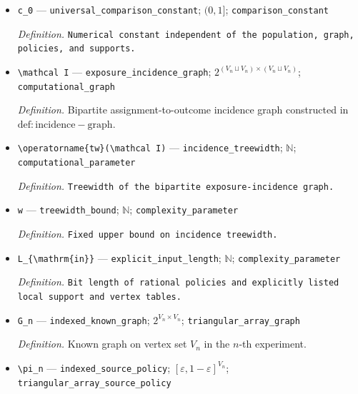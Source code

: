 \documentclass{article}
\begin{document}
\begin{itemize}
  \item \texttt{c\_\allowbreak{}0} --- \texttt{universal\_\allowbreak{}comparison\_\allowbreak{}constant}; \((0,1]\); \texttt{comparison\_\allowbreak{}constant}
  \par\smallskip\noindent\emph{Definition.} \texttt{Numerical constant independent of the population,\allowbreak{} graph,\allowbreak{} policies,\allowbreak{} and supports.}
  \item \texttt{\textbackslash{}\allowbreak{}mathcal I} --- \texttt{exposure\_\allowbreak{}incidence\_\allowbreak{}graph}; \(2^{(V_n\sqcup V_n)\times(V_n\sqcup V_n)}\); \texttt{computational\_\allowbreak{}graph}
  \par\smallskip\noindent\emph{Definition.} Bipartite assignment-to-outcome incidence graph constructed in \(\mathrm{def:incidence-graph}\).
  \item \texttt{\textbackslash{}\allowbreak{}operatorname\{tw\}\allowbreak{}(\textbackslash{}\allowbreak{}mathcal I)} --- \texttt{incidence\_\allowbreak{}treewidth}; \(\mathbb N\); \texttt{computational\_\allowbreak{}parameter}
  \par\smallskip\noindent\emph{Definition.} \texttt{Treewidth of the bipartite exposure-\allowbreak{}incidence graph.}
  \item \texttt{w} --- \texttt{treewidth\_\allowbreak{}bound}; \(\mathbb N\); \texttt{complexity\_\allowbreak{}parameter}
  \par\smallskip\noindent\emph{Definition.} \texttt{Fixed upper bound on incidence treewidth.}
  \item \texttt{L\_\allowbreak{}\{\textbackslash{}\allowbreak{}mathrm\{in\}\allowbreak{}\}\allowbreak{}} --- \texttt{explicit\_\allowbreak{}input\_\allowbreak{}length}; \(\mathbb N\); \texttt{complexity\_\allowbreak{}parameter}
  \par\smallskip\noindent\emph{Definition.} \texttt{Bit length of rational policies and explicitly listed local support and vertex tables.}
  \item \texttt{G\_\allowbreak{}n} --- \texttt{indexed\_\allowbreak{}known\_\allowbreak{}graph}; \(2^{V_n\times V_n}\); \texttt{triangular\_\allowbreak{}array\_\allowbreak{}graph}
  \par\smallskip\noindent\emph{Definition.} Known graph on vertex set \(V_n\) in the \(n\)-th experiment.
  \item \texttt{\textbackslash{}\allowbreak{}pi\_\allowbreak{}n} --- \texttt{indexed\_\allowbreak{}source\_\allowbreak{}policy}; \([\varepsilon,1-\varepsilon]^{V_n}\); \texttt{triangular\_\allowbreak{}array\_\allowbreak{}source\_\allowbreak{}policy}

\end{itemize}
\end{document}
